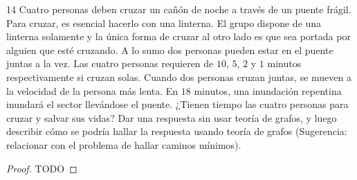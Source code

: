 \vspace{0.5cm}

\begin{ejercicio}{14}
    Cuatro personas deben cruzar un cañón de noche a través de un puente frágil. Para cruzar, es esencial hacerlo con una linterna. El grupo dispone de una linterna solamente y la única forma de cruzar al otro lado es que sea portada por alguien que esté cruzando. A lo sumo dos personas pueden estar en el puente juntas a la vez. Las cuatro personas requieren de \( 10 \), \( 5 \), \( 2 \) y \( 1 \) minutos respectivamente si cruzan solas. Cuando dos personas cruzan juntas, se mueven a la velocidad de la persona más lenta. En \( 18 \) minutos, una inundación repentina inundará el sector llevándose el puente. ¿Tienen tiempo las cuatro personas para cruzar y salvar sus vidas? Dar una respuesta sin usar teoría de grafos, y luego describir cómo se podría hallar la respuesta usando teoría de grafos (Sugerencia: relacionar con el problema de hallar caminos mínimos).
\end{ejercicio}
\begin{proof}
    TODO
\end{proof}
